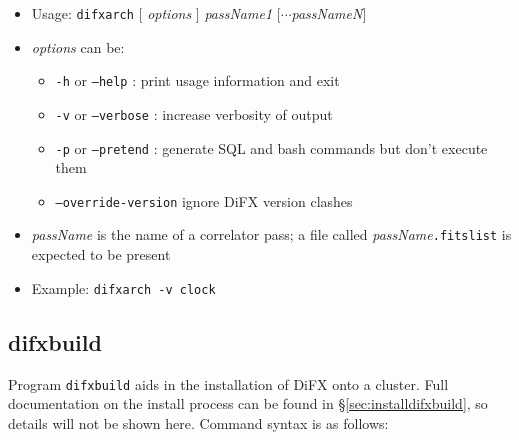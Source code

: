 \begin{itemize}
\item[] Usage: {\tt difxarch} $[$ {\em options} $]$ {\em passName1} $[\cdots${\em passNameN}$]$
\item[] {\em options} can be:
\begin{itemize}
\item[] {\tt -h} or {\tt --help} : print usage information and exit
\item[] {\tt -v} or {\tt --verbose} : increase verbosity of output
\item[] {\tt -p} or {\tt --pretend} : generate SQL and bash commands but don't execute them
\item[] {\tt --override-version} ignore DiFX version clashes 
\end{itemize}
\item[] {\em passName} is the name of a correlator pass; a file called {\em passName}{\tt .fitslist} is expected to be present
\item[] Example: {\tt difxarch -v clock}
\end{itemize}








\subsection{difxbuild} \label{sec:difxbuild}

Program {\tt difxbuild} aids in the installation of DiFX onto a cluster.
Full documentation on the install process can be found in \S\ref{sec:installdifxbuild}, so details will not be shown here.
Command syntax is as follows:

